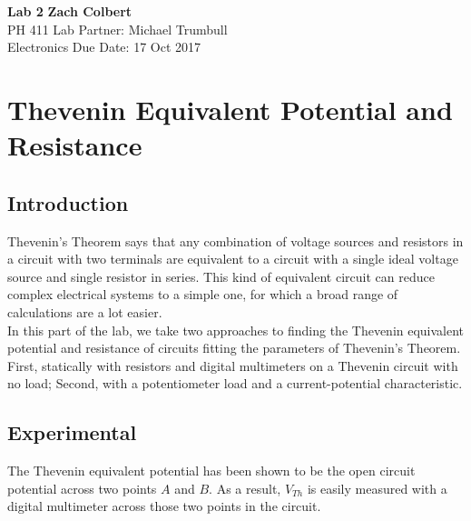 \documentclass[11pt]{article}
\begin{document}
\noindent
\large\textbf{Lab 2} \hfill \textbf{Zach Colbert} \\
\normalsize PH 411 \hfill Lab Partner: Michael Trumbull \\
Electronics  \hfill Due Date: 17 Oct 2017\\

\section{Thevenin Equivalent Potential and Resistance}
\subsection{Introduction}
    Thevenin's Theorem says that any combination of voltage sources and resistors in a circuit with two terminals are equivalent to a circuit with a single ideal voltage source and single resistor in series. This kind of equivalent circuit can reduce complex electrical systems to a simple one, for which a broad range of calculations are a lot easier. \\

    In this part of the lab, we take two approaches to finding the Thevenin equivalent potential and resistance of circuits fitting the parameters of Thevenin's Theorem. First, statically with resistors and digital multimeters on a Thevenin circuit with no load; Second, with a potentiometer load and a current-potential characteristic. \\

\subsection{Experimental}
    The Thevenin equivalent potential has been shown to be the open circuit potential across two points \(A\) and \(B\). As a result, \(V_{Th}\) is easily measured with a digital multimeter across those two points in the circuit. \\
    

\end{document}
